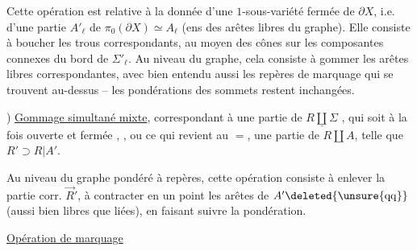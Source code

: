 Cette opération est relative à la donnée d'une $1$-sous-variété fermée de $\partial X$, i.e. d'une partie $A'_\ell$ de $\pi_0(\partial X)\simeq A_\ell$ (ens des arêtes libres du graphe). Elle consiste à boucher les trous correspondants, au moyen des cônes sur les composantes connexes du bord de $\Sigma'_\ell$. Au niveau du graphe, cela consiste à gommer les arêtes libres correspondantes, avec bien entendu aussi les repères de marquage qui se trouvent au-dessus --  les pondérations des sommets restent inchangées.

) \uline{Gommage simultané mixte},  correspondant à une partie  de $\underline{R\amalg\Sigma}$ , qui soit à la fois ouverte et fermée , , ou ce qui revient au $=$, une partie  de $R\amalg A$, telle que $R'\supset R|A'$.

Au niveau du graphe pondéré à repères, cette opération consiste à enlever  la partie corr. $\vec R'$, à contracter en un point les arêtes de $A'\deleted{\unsure{\mathrm{qq}}}$ (aussi bien libres que liées), en faisant suivre la pondération.

 \uline{Opération de marquage}


